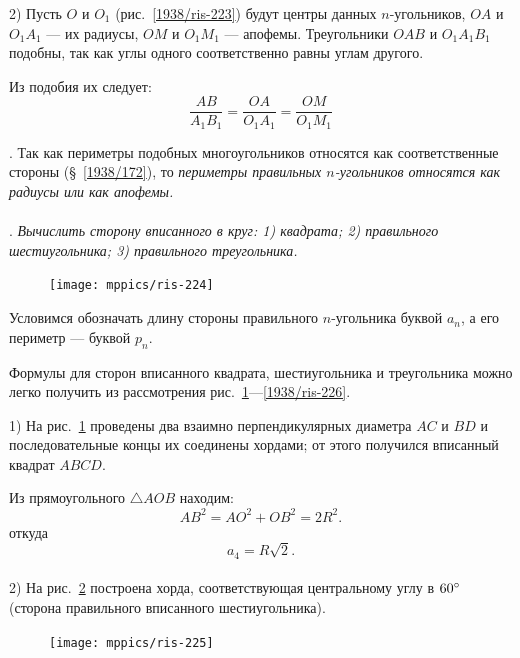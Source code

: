 \documentclass[oneside]{book}
\begin{document}
2) Пусть $O$ и $O_1$ (рис.~\ref{1938/ris-223}) будут центры данных $n$-угольников, $OA$ и $O_1A_1$ — их радиусы, $OM$ и $O_1M_1$ — апофемы.
Треугольники $OAB$ и $O_1A_1B_1$ подобны, так как углы одного соответственно равны углам другого.

Из подобия их следует:
\[\frac{AB}{A_1B_1}=\frac{OA}{O_1A_1} = \frac{OM}{O_1M_1}\]

\smallskip
{}.
Так как периметры подобных многоугольников относятся как соответственные стороны (§~\ref{1938/172}), то \emph{периметры правильных $n$-угольников относятся как радиусы или как апофемы.}


\paragraph{}\label{1938/219}
.
\emph{Вычислить сторону вписанного в круг:
1) квадрата;
2) правильного шестиугольника;
3) правильного треугольника.}

\begin{figure}
\centering
\texttt{[image: mppics/ris-224]}
\caption{}\label{1938/ris-224}
\end{figure}

Условимся обозначать длину стороны правильного $n$-угольника буквой $a_n$, а его периметр — буквой $p_n$.

Формулы для сторон вписанного квадрата, шестиугольника и треугольника можно легко получить из рассмотрения рис.~\ref{1938/ris-224}—\ref{1938/ris-226}.

1) На рис.~\ref{1938/ris-224} проведены два взаимно перпендикулярных диаметра $AC$ и $BD$ и последовательные концы их соединены хордами;
от этого получился вписанный квадрат $ABCD$.


Из прямоугольного $\triangle AOB$ находим:
\[AB^2=AO^2+OB^2=2R^2.\]
откуда
\[a_4=R\sqrt2.\]

\paragraph{}\label{1938/220}
2) На рис.~\ref{1938/ris-225} построена хорда, соответствующая центральному углу в $60\degree$ (сторона правильного вписанного шестиугольника).

\begin{figure}
\vskip-4mm
\centering
\texttt{[image: mppics/ris-225]}
\caption{}\label{1938/ris-225}
\end{figure}
\end{document}
